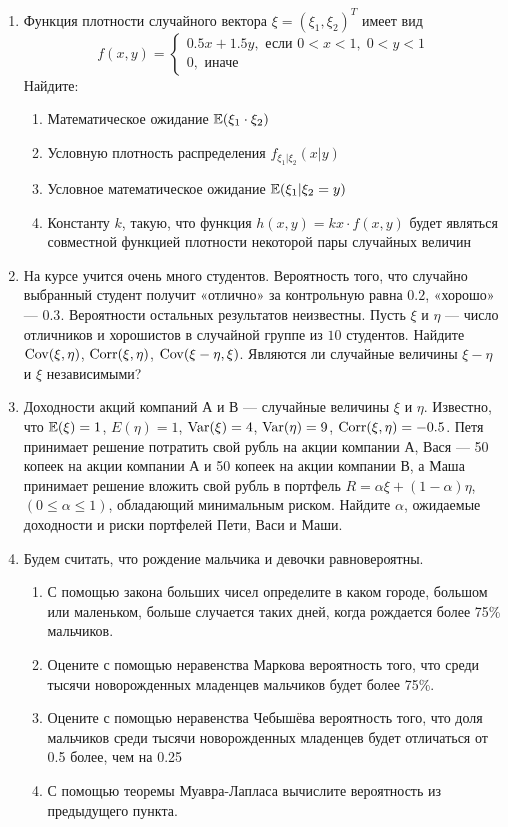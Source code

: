 \documentclass[12pt, a4paper]{article}\usepackage[]{graphicx}\usepackage[]{color}
\begin{document}
\begin{enumerate}
\item Функция плотности случайного вектора $\xi=(\xi_1, \xi_2)^T$ имеет вид
\[
f(x,y)=\begin{cases}
0.5x + 1.5y, \text{ если } 0<x<1, \; 0<y<1 \\
0, \text{ иначе }
\end{cases}
\]
Найдите:
\begin{enumerate}
\item Математическое ожидание $\mathbb{E}(\xi_1 \cdot \xi_2)$
\item Условную плотность распределения $f_{\xi_1|\xi_2} (x|y)$
\item Условное математическое ожидание $\mathbb{E}(\xi_1| \xi_2=y)$
\item Константу $k$, такую, что функция $h(x,y)=kx\cdot f(x,y)$ будет являться совместной функцией плотности некоторой пары случайных величин
\end{enumerate}

\item На курсе учится очень много студентов. Вероятность того, что случайно выбранный студент получит «отлично» за контрольную равна $0.2$, «хорошо» — $0.3$. Вероятности остальных результатов неизвестны. Пусть $\xi$ и $\eta$ — число отличников и хорошистов в случайной группе из $10$ студентов. Найдите $\operatorname{Cov}(\xi,\eta)$, $\operatorname{Corr}(\xi,\eta)$, $\operatorname{Cov}(\xi-\eta,\xi)$. Являются ли случайные величины $\xi-\eta$ и $\xi$ независимыми?

\item Доходности акций компаний А и В — случайные величины $\xi$ и $\eta$. Известно, что $\mathbb{E}(\xi)=1$, $E(\eta)=1$, $\operatorname{Var}(\xi)=4$, $\operatorname{Var}(\eta)=9$, $\operatorname{Corr}(\xi,\eta)=-0.5$. Петя принимает решение потратить свой рубль на акции компании А, Вася — 50 копеек на акции компании А и 50 копеек на акции компании В, а Маша  принимает решение вложить свой рубль в портфель $R=\alpha\xi+(1-\alpha)\eta$, $(0 \leq \alpha \leq 1)$, обладающий минимальным риском. Найдите $\alpha$, ожидаемые доходности и риски портфелей Пети, Васи и Маши.

\item Будем считать, что рождение мальчика и девочки равновероятны.
\begin{enumerate}
\item С помощью закона больших чисел определите в каком городе, большом или маленьком, больше случается таких дней, когда рождается более 75\% мальчиков.
\item Оцените с помощью неравенства Маркова вероятность того, что среди тысячи новорожденных младенцев мальчиков будет более 75\%.
\item Оцените с помощью неравенства Чебышёва вероятность того, что доля мальчиков среди тысячи новорожденных младенцев будет отличаться от 0.5 более, чем на 0.25
\item С помощью теоремы Муавра-Лапласа вычислите вероятность из предыдущего пункта.
\end{enumerate}


\end{enumerate}
\end{document}
